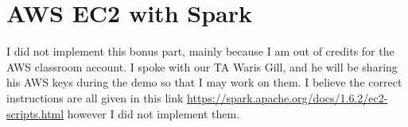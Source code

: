 \documentclass[12pt,reqno]{amsart}
\begin{document}
\section{AWS EC2 with Spark}
I did not implement this bonus part, mainly because I am out of credits for the AWS classroom account. I spoke with our TA Waris Gill, and he will be sharing his AWS keys during the demo so that I may work on them. I believe the correct instructions are all given in this link \url{https://spark.apache.org/docs/1.6.2/ec2-scripts.html} however I did not implement them.
\end{document}
